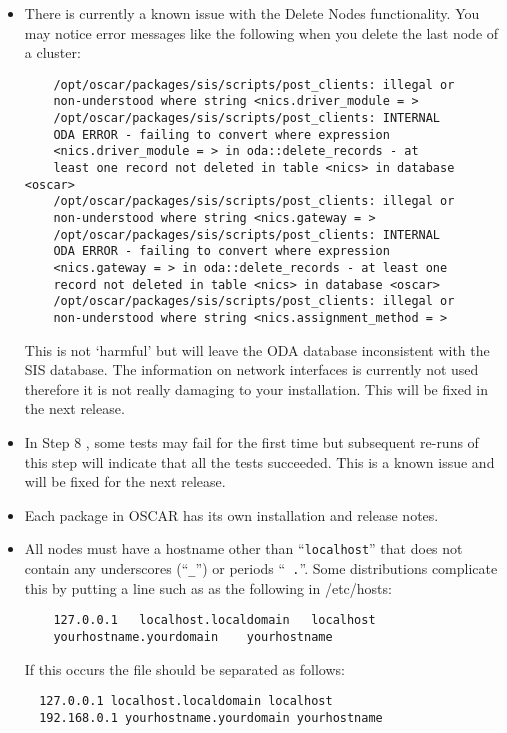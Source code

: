 \begin{itemize}

\item There is currently a known issue with the Delete Nodes functionality.
  You may notice error messages like the following when you delete the
  last node of a cluster:

  \begin{verbatim}
    /opt/oscar/packages/sis/scripts/post_clients: illegal or
    non-understood where string <nics.driver_module = >
    /opt/oscar/packages/sis/scripts/post_clients: INTERNAL
    ODA ERROR - failing to convert where expression
    <nics.driver_module = > in oda::delete_records - at
    least one record not deleted in table <nics> in database <oscar>
    /opt/oscar/packages/sis/scripts/post_clients: illegal or
    non-understood where string <nics.gateway = >
    /opt/oscar/packages/sis/scripts/post_clients: INTERNAL
    ODA ERROR - failing to convert where expression
    <nics.gateway = > in oda::delete_records - at least one
    record not deleted in table <nics> in database <oscar>
    /opt/oscar/packages/sis/scripts/post_clients: illegal or
    non-understood where string <nics.assignment_method = >
  \end{verbatim}

  This is not `harmful' but will leave the ODA database inconsistent
  with the SIS database.  The information on network interfaces is
  currently not used therefore it is not really damaging to your
  installation.  This will be fixed in the next release.

\item In Step 8 , some tests may fail for the first
  time but subsequent re-runs of this step will indicate that all the
  tests succeeded.  This is a known issue and will be fixed for the next
  release.

\item Each package in OSCAR has its own installation and release
  notes.   

\begchange
\item All nodes must have a hostname other than ``{\tt localhost}''
  that does not contain any underscores (``{\tt \_}'') or periods ``{\tt
  .}''.  Some distributions complicate this by putting a line such
  as as the following in /etc/hosts:
  \begin{verbatim}
    127.0.0.1   localhost.localdomain   localhost
    yourhostname.yourdomain    yourhostname
  \end{verbatim}
  If this occurs the file should be separated as follows:
  \begin{verbatim}
  127.0.0.1 localhost.localdomain localhost
  192.168.0.1 yourhostname.yourdomain yourhostname
  \end{verbatim}
\endchange


\end{itemize}

